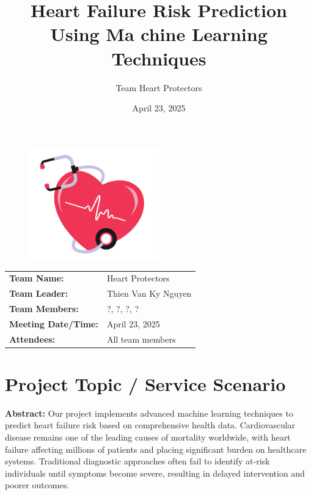 \documentclass[11pt,a4paper]{article}
\makeatletter
\renewcommand{\maketitle}{
  \begin{center}
    \vspace*{-0.25in} %
    {\LARGE \textbf{\@title}} \\[0.3cm]
    {\large \@subtitle} \\[0.2cm]
    {\normalsize \textit{\@author}} \\[0.1cm]
    {\normalsize \@date} \\
  \end{center}
  \vspace{0.3cm} %
}
\newcommand{\subtitle}[1]{\def\@subtitle{#1}}
\def\@subtitle{}
\makeatother
\begin{document}
\begin{figure}[H]
    \centering
    \includegraphics[width=0.5\textwidth]{./pictures/cover.png}
\end{figure}




\title{Heart Failure Risk Prediction Using Ma chine Learning Techniques}
\subtitle{Team Meeting Report – Final Report}
\author{Team Heart Protectors}
\date{April 23, 2025}


\begin{tabular}{ll}
    \textbf{Team Name:}         & Heart Protectors    \\
    \textbf{Team Leader:}       & Thien Van Ky Nguyen \\
    \textbf{Team Members:}      & ?, ?, ?, ?          \\
    \textbf{Meeting Date/Time:} & April 23, 2025      \\
    \textbf{Attendees:}         & All team members
\end{tabular}

\section{Project Topic / Service Scenario}

\textbf{Abstract:} Our project implements advanced machine learning techniques to predict heart failure
risk based on comprehensive health data.
Cardiovascular disease remains one of the leading causes of mortality worldwide,
with heart failure affecting millions of patients and placing significant
burden on healthcare systems.
Traditional diagnostic approaches often fail to identify
at-risk individuals until symptoms become severe,
resulting in delayed intervention and poorer outcomes.
\end{document}
